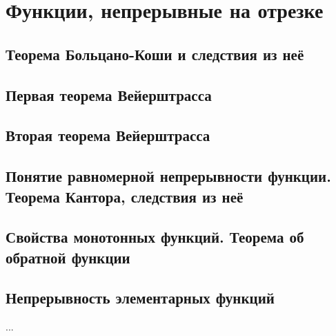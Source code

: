 \section{Функции, непрерывные на отрезке}
\subsection{Теорема Больцано-Коши и следствия из неё}

\subsection{Первая теорема Вейерштрасса}

\subsection{Вторая теорема Вейерштрасса}

\subsection{Понятие равномерной непрерывности функции. Теорема Кантора, следствия из неё}


\subsection{Свойства монотонных функций. Теорема об обратной функции}


\subsection{Непрерывность элементарных функций}
...

